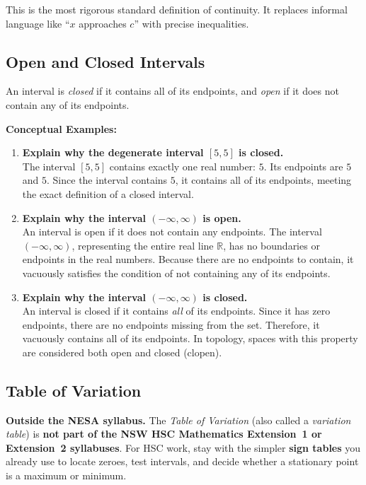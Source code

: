 \documentclass[12pt]{article}
\theoremstyle{definition}
\begin{document}
This is the most rigorous standard definition of continuity. It replaces informal language like ``$x$ approaches $c$'' with precise inequalities.

\subsection{Open and Closed Intervals}

An interval is \emph{closed} if it contains all of its endpoints, and \emph{open} if it does not contain any of its endpoints.

\textbf{Conceptual Examples:}
\begin{enumerate}[label=\textbf{\alph*.}]
  \item \textbf{Explain why the degenerate interval $[5, 5]$ is closed.} \\
  The interval $[5, 5]$ contains exactly one real number: $5$. Its endpoints are $5$ and $5$. Since the interval contains $5$, it contains all of its endpoints, meeting the exact definition of a closed interval.
  
  \item \textbf{Explain why the interval $(-\infty, \infty)$ is open.} \\
  An interval is open if it does not contain any endpoints. The interval $(-\infty, \infty)$, representing the entire real line $\mathbb{R}$, has no boundaries or endpoints in the real numbers. Because there are no endpoints to contain, it vacuously satisfies the condition of not containing any of its endpoints.
  
  \item \textbf{Explain why the interval $(-\infty, \infty)$ is closed.} \\
  An interval is closed if it contains \emph{all} of its endpoints. Since it has zero endpoints, there are no endpoints missing from the set. Therefore, it vacuously contains all of its endpoints. In topology, spaces with this property are considered both open and closed (clopen).
\end{enumerate}

\subsection{Table of Variation}

\textbf{Outside the NESA syllabus.} The \emph{Table of Variation} (also called a \emph{variation table}) is \textbf{not part of the NSW HSC Mathematics Extension~1 or Extension~2 syllabuses}. For HSC work, stay with the simpler \textbf{sign tables} you already use to locate zeroes, test intervals, and decide whether a stationary point is a maximum or minimum.
\end{document}
